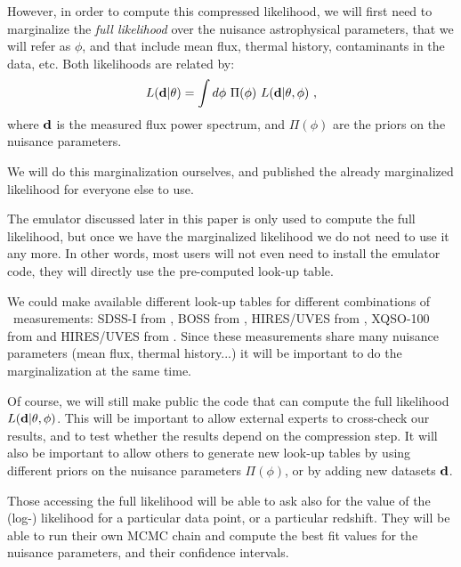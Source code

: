 However, in order to compute this compressed likelihood, we will first need
to marginalize the \textit{full likelihood} over the nuisance astrophysical
parameters, that we will refer as $\phi$, and that include mean flux,
thermal history, contaminants in the data, etc.
Both likelihoods are related by:
\begin{equation} \label{eq:marg}
 L(\mathbf{d} | \theta)
  = \int d\phi ~ \Pi(\phi) ~ L(\mathbf{d} | \theta, \phi) ~,
\end{equation}
where $\mathbf{d}$ is the measured flux power spectrum, and $\Pi(\phi)$ are the
priors on the nuisance parameters.

We will do this marginalization ourselves, and published the already
marginalized likelihood for everyone else to use.

The emulator discussed later in this paper is only used to compute the
full likelihood, but once we have the marginalized likelihood we do not
need to use it any more.
In other words, most users will not even need to install the emulator code,
they will directly use the pre-computed look-up table.

We could make available different look-up tables for different combinations
of \lya\ measurements:
SDSS-I from \cite{McDonald2006},
BOSS from \cite{Palanque-Delabrouille2013},
HIRES/UVES from \cite{Viel2013},
XQSO-100 from \cite{Irsic2017} and
HIRES/UVES from \cite{Walther2018a}.
Since these measurements share many nuisance parameters (mean flux,
thermal history...) it will be important to do the marginalization
at the same time.

Of course, we will still make public the code that can compute the full
likelihood $L(\mathbf{d} | \theta, \phi)$.
This will be important to allow external experts to cross-check our results,
and to test whether the results depend on the compression step.
It will also be important to allow others to generate new look-up tables
by using different priors on the nuisance parameters $\Pi(\phi)$, or by adding
new datasets $\mathbf{d}$.

Those accessing the full likelihood will be able to ask also for the value
of the (log-) likelihood for a particular data point, or a particular
redshift.
They will be able to run their own MCMC chain and compute the best fit 
values for the nuisance parameters, and their confidence intervals.

